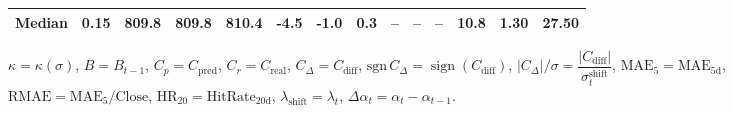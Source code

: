 \begin{threeparttable}
{\begin{tabular}{lrrrrrrrrrrrrr}
 Median &     0.15 & 809.8 & 809.8 & 810.4 &       -4.5 &                     -1.0 &                 0.3 &         -- &        -- &             -- &             10.8 &            1.30 &                  27.50 \\
\bottomrule
\end{tabular}
}
\begin{tablenotes}\footnotesize
\item $\kappa=\kappa(\sigma)$, $B=B_{t-1}$, $C_p=C_{\text{pred}}$, $C_r=C_{\text{real}}$, $C_\Delta=C_{\text{diff}}$, $\mathrm{sgn}\,C_\Delta=\operatorname{sign}(C_{\text{diff}})$, $|C_\Delta|/\sigma=\dfrac{|C_{\text{diff}}|}{\sigma_t^{\text{shift}}}$, $\mathrm{MAE}_5=\mathrm{MAE}_{5\text{d}}$, $\mathrm{RMAE}= \mathrm{MAE}_5 / \text{Close}$, $\mathrm{HR}_{20}=\mathrm{HitRate}_{20\text{d}}$, 
$\lambda_{\text{shift}}=\lambda_t$, 
$\Delta\alpha_t=\alpha_t-\alpha_{t-1}$.
\end{tablenotes}
\end{threeparttable}
\endgroup

